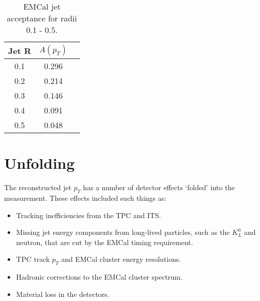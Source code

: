 \begin{table}[hb]
\label{tab:AcceptanceFactor}
\begin{center}
\begin{tabular}[b]{|c|c|c|}
	\hline
	Jet R & $A(p_{T})$ \\ \hline
	0.1 & 0.296 \\ \hline
	0.2 & 0.214\\ \hline
	0.3 & 0.146\\ \hline
	0.4 & 0.091\\ \hline
	0.5 & 0.048\\ \hline
\end{tabular}
\end{center}
\caption{EMCal jet acceptance for radii 0.1 - 0.5.}
\end{table}








\section{Unfolding}

The reconstructed jet $p_{T}$ has a number of detector effects `folded' into the measurement.  These effects included such things as:

\begin{itemize}
\item Tracking inefficiencies from the TPC and ITS.
\item Missing jet energy components from long-lived particles, such as the $K^{0}_{L}$ and neutron, that are cut by the EMCal timing requirement.
\item TPC track $p_{T}$ and EMCal cluster energy resolutions.
\item Hadronic corrections to the EMCal cluster spectrum.
\item Material loss in the detectors.
\end{itemize}

